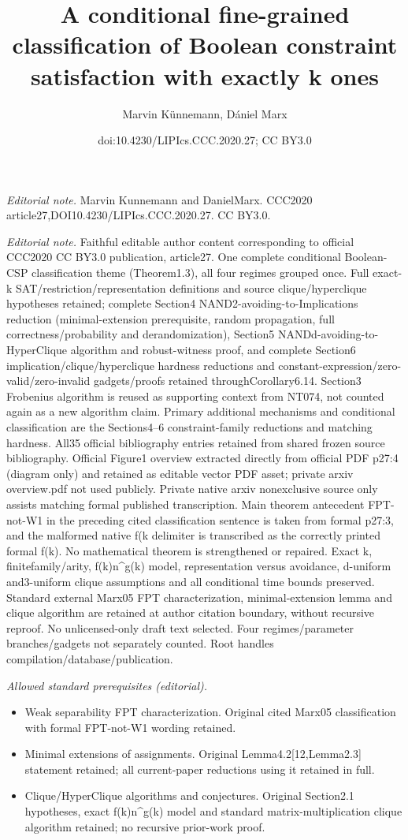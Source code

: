 \documentclass[10pt,a4paper]{article}
\title{A conditional fine-grained classification of Boolean constraint satisfaction with exactly k ones}
\author{Marvin Künnemann, Dániel Marx}
\date{doi:10.4230/LIPIcs.CCC.2020.27; CC BY3.0}
\theoremstyle{plain}
\begin{document}
\maketitle
\noindent\textit{Editorial note.} Marvin Kunnemann and DanielMarx. CCC2020 article27,DOI10.4230/LIPIcs.CCC.2020.27. CC BY3.0.\par\medskip
\noindent\textit{Editorial note.} Faithful editable author content corresponding to official CCC2020 CC BY3.0 publication, article27. One complete conditional Boolean-CSP classification theme (Theorem1.3), all four regimes grouped once. Full exact-k SAT/restriction/representation definitions and source clique/hyperclique hypotheses retained; complete Section4 NAND2-avoiding-to-Implications reduction (minimal-extension prerequisite, random propagation, full correctness/probability and derandomization), Section5 NANDd-avoiding-to-HyperClique algorithm and robust-witness proof, and complete Section6 implication/clique/hyperclique hardness reductions and constant-expression/zero-valid/zero-invalid gadgets/proofs retained throughCorollary6.14. Section3 Frobenius algorithm is reused as supporting context from NT074, not counted again as a new algorithm claim. Primary additional mechanisms and conditional classification are the Sections4--6 constraint-family reductions and matching hardness. All35 official bibliography entries retained from shared frozen source bibliography. Official Figure1 overview extracted directly from official PDF p27:4 (diagram only) and retained as editable vector PDF asset; private arxiv overview.pdf not used publicly. Private native arxiv nonexclusive source only assists matching formal published transcription. Main theorem antecedent FPT-not-W1 in the preceding cited classification sentence is taken from formal p27:3, and the malformed native f(k delimiter is transcribed as the correctly printed formal f(k). No mathematical theorem is strengthened or repaired. Exact k, finitefamily/arity, f(k)n\textasciicircum{}g(k) model, representation versus avoidance, d-uniform and3-uniform clique assumptions and all conditional time bounds preserved. Standard external Marx05 FPT characterization, minimal-extension lemma and clique algorithm are retained at author citation boundary, without recursive reproof. No unlicensed-only draft text selected. Four regimes/parameter branches/gadgets not separately counted. Root handles compilation/database/publication.\par\medskip
\noindent\textit{Allowed standard prerequisites (editorial).}\begin{itemize}
\item Weak separability FPT characterization. Original cited Marx05 classification with formal FPT-not-W1 wording retained.
\item Minimal extensions of assignments. Original Lemma4.2[12,Lemma2.3] statement retained; all current-paper reductions using it retained in full.
\item Clique/HyperClique algorithms and conjectures. Original Section2.1 hypotheses, exact f(k)n\textasciicircum{}g(k) model and standard matrix-multiplication clique algorithm retained; no recursive prior-work proof.
\end{itemize}\medskip
\end{document}
